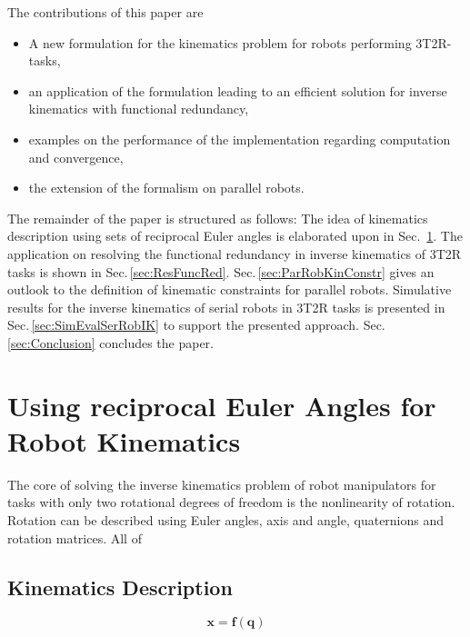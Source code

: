 \documentclass[twocolumn,10pt]{IFTOMM}
\newcommand{\bm}[1]{\boldsymbol{#1}}
\begin{document}
The contributions of this paper are
\begin{itemize}
    \item A new formulation for the kinematics problem for robots performing 3T2R-tasks,
    \item an application of the formulation leading to an efficient solution for inverse kinematics with functional redundancy,
    \item examples on the performance of the implementation regarding computation and convergence,
    \item the extension of the formalism on parallel robots.
\end{itemize}

The remainder of the paper is structured as follows: The idea of kinematics description using sets of reciprocal Euler angles is elaborated upon in Sec.\, \ref{sec:RecEulAng}.
The application on resolving the functional redundancy in inverse kinematics of 3T2R tasks is shown in Sec.\,\ref{sec:ResFuncRed}.
Sec.\,\ref{sec:ParRobKinConstr} gives an outlook to the definition of kinematic constraints for parallel robots. 
Simulative results for the inverse kinematics of serial robots in 3T2R tasks is presented in Sec.\,\ref{sec:SimEvalSerRobIK} to support the presented approach. Sec.\,\ref{sec:Conclusion} concludes the paper.

\section{Using reciprocal Euler Angles for Robot Kinematics}
\label{sec:RecEulAng}

The core of solving the inverse kinematics problem of robot manipulators for tasks with only two rotational degrees of freedom is the nonlinearity of rotation.
Rotation can be described using Euler angles, axis and angle, quaternions and rotation matrices. All of 

\subsection{Kinematics Description}


\begin{equation}
\bm{x}
=
\bm{f} (\bm{q})
\end{equation}  
\end{document}

